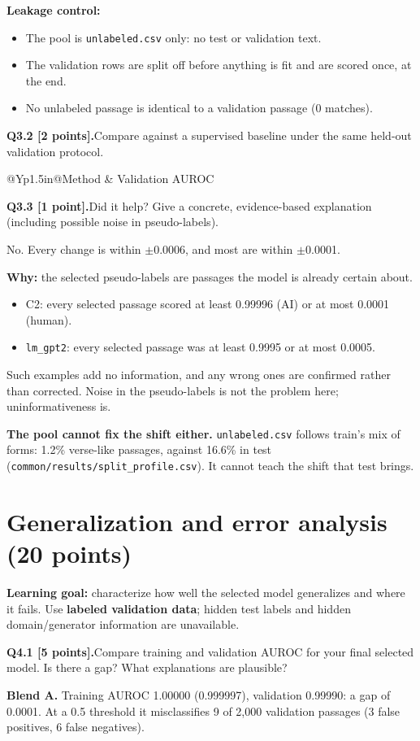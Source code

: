 \documentclass[11pt,letterpaper]{article}
\newcommand{\question}[2]{\needspace{4\baselineskip}\par\addvspace{0.45em}\noindent\textbf{#1}\quad #2\par\nobreak\vspace{0.1em}}
\begin{document}
\textbf{Leakage control:}
\begin{itemize}
\item The pool is \texttt{unlabeled.csv} only: no test or validation text.
\item The validation rows are split off before anything is fit and are scored once, at the end.
\item No unlabeled passage is identical to a validation passage (0 matches).
\end{itemize}
\question{Q3.2 [2 points].}{Compare against a supervised baseline under the same held-out validation protocol.}
\begin{tabularx}{\linewidth}{@{}Yp{1.5in}@{}}\toprule Method & Validation AUROC \\ \midrule
{}
\bottomrule\end{tabularx}
\question{Q3.3 [1 point].}{Did it help? Give a concrete, evidence-based explanation (including possible noise in pseudo-labels).}
No. Every change is within $\pm$0.0006, and most are within $\pm$0.0001.

\textbf{Why:} the selected pseudo-labels are passages the model is already certain about.
\begin{itemize}
\item C2: every selected passage scored at least 0.99996 (AI) or at most 0.0001 (human).
\item \texttt{lm\_gpt2}: every selected passage was at least 0.9995 or at most 0.0005.
\end{itemize}
Such examples add no information, and any wrong ones are confirmed rather than corrected. Noise in the pseudo-labels is not the problem here; uninformativeness is.

\textbf{The pool cannot fix the shift either.} \texttt{unlabeled.csv} follows train's mix of forms: 1.2\% verse-like passages, against 16.6\% in test (\texttt{common/results/split\_profile.csv}). It cannot teach the shift that test brings.

\newpage
\section{Generalization and error analysis (20 points)}
\textbf{Learning goal:} characterize how well the selected model generalizes and where it fails. Use \textbf{labeled validation data}; hidden test labels and hidden domain/generator information are unavailable.

\question{Q4.1 [5 points].}{Compare training and validation AUROC for your final selected model. Is there a gap? What explanations are plausible?}
\textbf{Blend A.} Training AUROC 1.00000 (0.999997), validation 0.99990: a gap of 0.0001. At a 0.5 threshold it misclassifies 9 of 2,000 validation passages (3 false positives, 6 false negatives).
\end{document}
